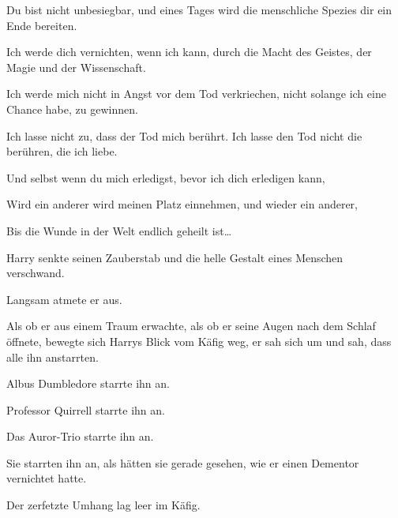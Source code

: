 \begin{em}
Du bist nicht unbesiegbar, und eines Tages wird die menschliche Spezies dir ein Ende bereiten.

Ich werde dich vernichten, wenn ich kann, durch die Macht des Geistes, der Magie und der Wissenschaft.

Ich werde mich nicht in Angst vor dem Tod verkriechen, nicht solange ich eine Chance habe, zu gewinnen.

Ich lasse nicht zu, dass der Tod mich berührt. Ich lasse den Tod nicht die berühren, die ich liebe.

Und selbst wenn du mich erledigst, bevor ich dich erledigen kann,

Wird ein anderer wird meinen Platz einnehmen, und wieder ein anderer,

Bis die Wunde in der Welt endlich geheilt ist…
\end{em}

Harry senkte seinen Zauberstab und die helle Gestalt eines Menschen verschwand.

Langsam atmete er aus.

Als ob er aus einem Traum erwachte, als ob er seine Augen nach dem Schlaf öffnete, bewegte sich Harrys Blick vom Käfig weg, er sah sich um und sah, dass alle ihn anstarrten.

Albus Dumbledore starrte ihn an.

Professor Quirrell starrte ihn an.

Das Auror-Trio starrte ihn an.

Sie starrten ihn an, als hätten sie gerade gesehen, wie er einen Dementor vernichtet hatte.

Der zerfetzte Umhang lag leer im Käfig.


